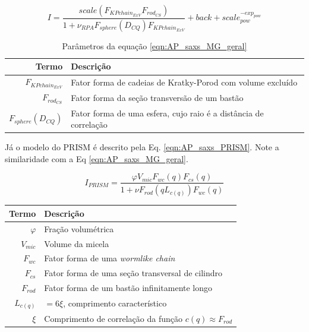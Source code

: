 \begin{apendicesenv}
\begin{equation}
I = \frac{scale\left(F_{KPchain_{ExV}}F_{rod_{CS}}\right)}{1 + \nu_{RPA} F_{sphere}\left( D_{CQ}\right) F_{KPchain_{ExV}}} + back + scale_{pow}^{-exp_{pow}}
\label{eqn:AP_saxs_MG_geral}
\end{equation}

\begin{table}
    \IBGEtab%
    {\caption{Parâmetros da equação \ref{eqn:AP_saxs_MG_geral}}
     \label{tab_ap:fatores_geral} }%
    {\begin{tabular}{r p{8cm}}
    \toprule
    Termo 			& Descrição        						\\
    \midrule
    $F_{KPchain_{ExV}}$  & Fator forma de cadeias de Kratky-Porod com volume excluído \\
    $F_{rod_{CS}}$		 & Fator forma da seção transversão de um bastão	\\
    $F_{sphere}(D_{CQ})$ & Fator forma de uma esfera, cujo raio é a distância de correlação \\
    \bottomrule%
    \end{tabular}}
    {}%
\end{table}


Já o modelo do PRISM é descrito pela Eq. \ref{eqn:AP_saxs_PRISM}. Note a similaridade com a Eq \ref{eqn:AP_saxs_MG_geral}.

\begin{equation}
I_{PRISM}= \frac{\varphi V_{mic}F_{wc}(q)F_{cs}(q)}{1 + \nu F_{rod}(qL_{c(q)})F_{wc}(q)}
\label{eqn:AP_saxs_PRISM}
\end{equation}

\begin{table}
    {%
     \begin{tabular}{r p{8cm}}
     \toprule
     Termo 			& Descrição        						\\
     \midrule
     $\varphi$		& Fração volumétrica \\ %
     $V_{mic}$		& Volume da micela   \\
     $F_{wc}$		& Fator forma de uma \emph{wormlike chain} \\
     $F_{cs}$		& Fator forma de uma seção transversal de cilindro \\ %
     $F_{rod}$		& Fator forma de um bastão infinitamente longo \\
     $L_{c(q)}$		& $=6\xi$, comprimento característico \\
     $\xi$			& Comprimento de correlação da função $c(q) \approx F_{rod}$ \\
     \bottomrule
     \end{tabular}}%
     {}%
\end{table}



\end{apendicesenv}
